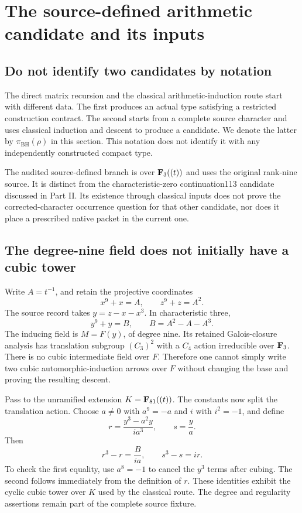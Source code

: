 \section{The source-defined arithmetic candidate and its inputs}\label{sec:induction}
\subsection{Do not identify two candidates by notation}
The direct matrix recursion and the classical arithmetic-induction route start with different data. The first produces an actual type satisfying a restricted construction contract. The second starts from a complete source character and uses classical induction and descent to produce a candidate. We denote the latter by $\pi_{\mathrm{BH}}(\rho)$ in this section. This notation does not identify it with any independently constructed compact type.

The audited source-defined branch is over $\mathbf F_3((t))$ and uses the original rank-nine source. It is distinct from the characteristic-zero continuation113 candidate discussed in Part II. Its existence through classical inputs does not prove the corrected-character occurrence question for that other candidate, nor does it place a prescribed native packet in the current one.

\subsection{The degree-nine field does not initially have a cubic tower}
Write $A=t^{-1}$, and retain the projective coordinates
\[
 x^9+x=A,\qquad z^9+z=A^2.
\]
The source record takes $y=z-x-x^3$. In characteristic three,
\[
 y^9+y=B,\qquad B=A^2-A-A^3.
 \tag{25.1}\label{eq:B}
\]
The inducing field is $M=F(y)$, of degree nine. Its retained Galois-closure analysis has translation subgroup $(C_3)^2$ with a $C_4$ action irreducible over $\mathbf F_3$. There is no cubic intermediate field over $F$. Therefore one cannot simply write two cubic automorphic-induction arrows over $F$ without changing the base and proving the resulting descent.

Pass to the unramified extension $K=\mathbf F_{81}((t))$. The constants now split the translation action. Choose $a\ne0$ with $a^9=-a$ and $i$ with $i^2=-1$, and define
\[
 r=\frac{y^3-a^2y}{ia^3},\qquad s=\frac ya.
\]
Then
\[
 r^3-r=\frac{B}{ia},\qquad s^3-s=ir.
 \tag{25.2}\label{eq:tower}
\]
To check the first equality, use $a^8=-1$ to cancel the $y^3$ terms after cubing. The second follows immediately from the definition of $r$. These identities exhibit the cyclic cubic tower over $K$ used by the classical route. The degree and regularity assertions remain part of the complete source fixture.

